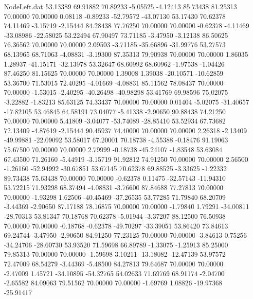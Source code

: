 \begin{filecontents}{NodeLeft.dat}
  53.13389   69.91882   70.89233    -5.05525   -4.12413   85.73438   81.25313   70.00000   70.00000    0.08118   -0.89233  -52.79572  -43.07130
  53.17430   70.62378   74.11469    -3.15719   -2.15444   84.28438   77.76250   70.00000   70.00000   -0.62378   -4.11469  -33.08986  -22.58025
  53.22494   67.90497   73.71185    -3.47950   -3.12138   86.50625   76.36562   70.00000   70.00000    2.09503   -3.71185  -35.66896  -31.99776
  53.27573   68.13965   68.71063    -4.08831   -3.19300   87.35313   79.90938   70.00000   70.00000    1.86035    1.28937  -41.15171  -32.13978
  53.32647   68.60992   68.60962    -1.97538   -1.04426   87.46250   81.15625   70.00000   70.00000    1.39008    1.39038  -20.10571  -10.62859
  53.36700   71.53015   72.40295    -4.01669   -4.08831   85.11562   78.08437   70.00000   70.00000   -1.53015   -2.40295  -40.26498  -40.98298
  53.41769   69.98596   75.02075    -3.22882   -1.83213   85.63125   74.33437   70.00000   70.00000    0.01404   -5.02075  -31.40657  -17.82105
  53.46845   64.58191   73.04077    -5.41338   -2.90650   90.88438   74.21250   70.00000   70.00000    5.41809   -3.04077  -53.74089  -28.85410
  53.52934   67.73682   72.13409    -4.87619   -2.15444   90.45937   74.40000   70.00000   70.00000    2.26318   -2.13409  -49.99881  -22.09092
  53.58017   67.20001   70.18738    -4.55388   -0.18476   91.19063   75.67500   70.00000   70.00000    2.79999   -0.18738  -45.24107   -1.83548
  53.63084   67.43500   71.26160    -5.44919   -3.15719   91.92812   74.91250   70.00000   70.00000    2.56500   -1.26160  -52.94992  -30.67851
  53.67145   70.62378   69.88525    -3.33625   -1.22332   89.73438   75.63438   70.00000   70.00000   -0.62378    0.11475  -32.57143  -11.94310
  53.72215   71.93298   68.37494    -4.08831   -3.76600   87.84688   77.27813   70.00000   70.00000   -1.93298    1.62506  -40.45469  -37.26535
  53.77285   71.79840   68.20709    -3.44369   -2.90650   87.17188   78.16875   70.00000   70.00000   -1.79840    1.79291  -34.00811  -28.70313
  53.81347   70.18768   70.62378    -5.01944   -3.37207   88.12500   76.50938   70.00000   70.00000   -0.18768   -0.62378  -49.70297  -33.39051
  53.86420   73.84613   69.24744    -3.47950   -2.90650   84.91250   77.23125   70.00000   70.00000   -3.84613    0.75256  -34.24706  -28.60730
  53.93520   71.59698   66.89789    -1.33075   -1.25913   85.25000   79.85313   70.00000   70.00000   -1.59698    3.10211  -13.18082  -12.47139
  53.97572   72.47009   68.54279    -3.44369   -5.48500   84.27813   79.64687   70.00000   70.00000   -2.47009    1.45721  -34.10895  -54.32765
  54.02633   71.69769   68.91174    -2.04700   -2.65582   84.09063   79.51562   70.00000   70.00000   -1.69769    1.08826  -19.97368  -25.91417

\end{filecontents}
